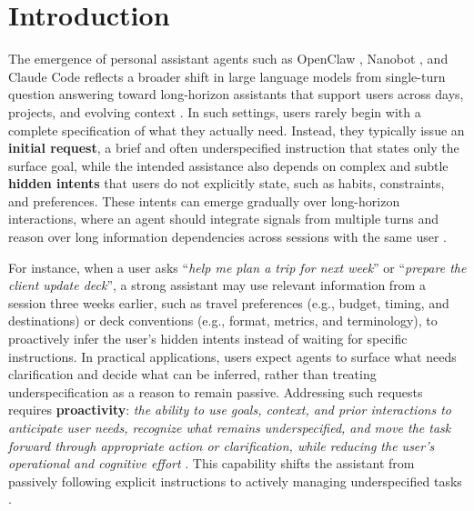 \documentclass{llmxive}
\begin{document}



\section{Introduction}
\label{sec:intro}

The emergence of personal assistant agents such as OpenClaw \citep{openclaw}, Nanobot \citep{nanobot}, and Claude Code \citep{claudecode} reflects a broader shift in large language models from single-turn question answering toward long-horizon assistants that support users across days, projects, and evolving context \citep{mialon2023gaia,li2026clawsbench}. 
In such settings, users rarely begin with a complete specification of what they actually need. Instead, they typically issue an \textbf{initial request}, a brief and often underspecified instruction that states only the surface goal, while the intended assistance also depends on complex and subtle \textbf{hidden intents} that users do not explicitly state, such as habits, constraints, and preferences. These intents can emerge gradually over long-horizon interactions, where an agent should integrate signals from multiple turns and reason over long information dependencies across sessions with the same user \citep{kim2026persona2web,lyu2026personalalign,liu2026perma}.

For instance, when a user asks ``\textit{help me plan a trip for next week}'' or ``\textit{prepare the client update deck}'', a strong assistant may use relevant information from a session three weeks earlier, such as travel preferences (e.g., budget, timing, and destinations) or deck conventions (e.g., format, metrics, and terminology), to proactively infer the user's hidden intents instead of waiting for specific instructions.
In practical applications, users expect agents to surface what needs clarification and decide what can be inferred, rather than treating underspecification as a reason to remain passive.
Addressing such requests requires \textbf{proactivity}: \textit{the ability to use goals, context, and prior interactions to anticipate user needs, recognize what remains underspecified, and move the task forward through appropriate action or clarification, while reducing the user’s operational and cognitive effort} \citep{sun2026ambibench,kong2026proactivemobile,kaur2026proper}. 
This capability shifts the assistant from passively following explicit instructions to actively managing underspecified tasks \citep{xie2026pask}.
\end{document}
